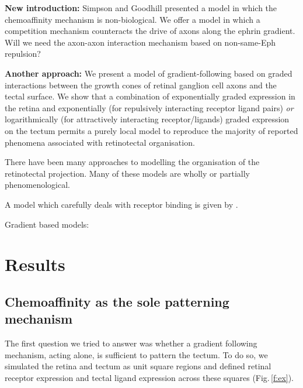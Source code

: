 \documentclass[11pt, a4paper]{article}
\begin{document}
\color{grey}
\textbf{New introduction:} Simpson and Goodhill presented a model in which the
chemoaffinity mechanism is non-biological. We offer a model in which a
competition mechanism counteracts the drive of axons along the ephrin
gradient. Will we need the axon-axon interaction mechanism based on
non-same-Eph repulsion?

\textbf{Another approach:} We present a model of gradient-following based on graded
interactions between the growth cones of retinal ganglion cell axons and the
tectal surface. We show that a combination of exponentially graded expression
in the retina \citep{reber_relative_2004} and exponentially (for repulsively
interacting receptor ligand pairs) \emph{or} logarithmically (for attractively
interacting receptor/ligands) graded expression on the tectum permits a purely
local model to reproduce the majority of reported phenomena associated with
retinotectal organisation.

There have been many approaches to modelling the organisation of the
retinotectal projection. Many of these models are wholly or partially
phenomenological.

A model which carefully deals with receptor
binding is given by \citet{naoki_revisiting_2017} \citep[see also][]{mortimer_bayesian_2009}.

Gradient based models: \citet{nakamoto_topographically_1996}

\color{black}
\section{Results}

\subsection*{Chemoaffinity as the sole patterning mechanism}

The first question we tried to answer was whether a gradient following
mechanism, acting alone, is sufficient to pattern the tectum. To do so, we
simulated the retina and tectum as unit square regions and defined retinal
receptor expression and tectal ligand expression across these squares
(Fig.\,\ref{f:ex}).
\end{document}
